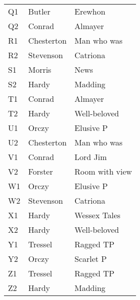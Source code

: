 \begin{table}[H]
\begin{tabular}{l l l}
    Q1 & Butler & Erewhon \\
    Q2 & Conrad & Almayer \\
    R1 & Chesterton & Man who was \\
    R2 & Stevenson & Catriona \\
    S1 & Morris & News \\
    S2 & Hardy & Madding \\
    T1 & Conrad & Almayer \\
    T2 & Hardy & Well-beloved \\
    U1 & Orczy & Elusive P \\
    U2 & Chesterton & Man who was \\
    V1 & Conrad & Lord Jim \\
    V2 & Forster & Room with view \\
    W1 & Orczy & Elusive P \\
    W2 & Stevenson & Catriona \\
    X1 & Hardy & Wessex Tales \\
    X2 & Hardy & Well-beloved \\
    Y1 & Tressel & Ragged TP \\
    Y2 & Orczy & Scarlet P \\
    Z1 & Tressel & Ragged TP \\
    Z2 & Hardy & Madding \\
    \bottomrule
  \end{tabular}
\end{table}

